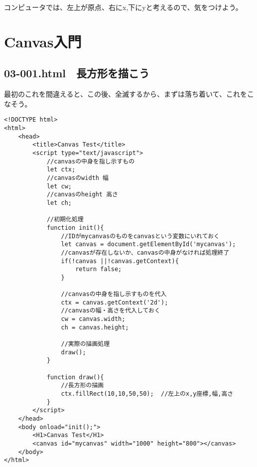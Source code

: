 \documentclass[mingoth,11pt,a4j,uplatex]{jsarticle}
\begin{document}
コンピュータでは、左上が原点、右にx,下にyと考えるので、気をつけよう。

\newpage
\section{Canvas入門}
\subsection{03-001.html　長方形を描こう}
最初のこれを間違えると、この後、全滅するから、まずは落ち着いて、これをこなそう。

\begin{lstlisting}[caption=長方形を描こう]
<!DOCTYPE html>
<html>
	<head>
		<title>Canvas Test</title>
		<script type="text/javascript">
			//canvasの中身を指し示すもの
			let ctx;
			//canvasのwidth 幅
			let cw;
			//canvasのheight 高さ
			let ch;
			
			//初期化処理
			function init(){
				//IDがmycanvasのものをcanvasという変数にいれておく
				let canvas = document.getElementById('mycanvas');
				//canvasが存在しないか、canvasの中身がなければ処理終了
				if(!canvas ||!canvas.getContext){
					return false;
				}
				
				//canvasの中身を指し示すものを代入
				ctx = canvas.getContext('2d');
				//canvasの幅・高さを代入しておく
				cw = canvas.width;
				ch = canvas.height;
				
				//実際の描画処理
				draw();
			}
			
			function draw(){
				//長方形の描画
				ctx.fillRect(10,10,50,50);	//左上のx,y座標,幅,高さ
			}
		</script>
	</head>
	<body onload="init();">
		<H1>Canvas Test</H1>
		<canvas id="mycanvas" width="1000" height="800"></canvas>
	</body>
</html>
\end{lstlisting}
\end{document}
